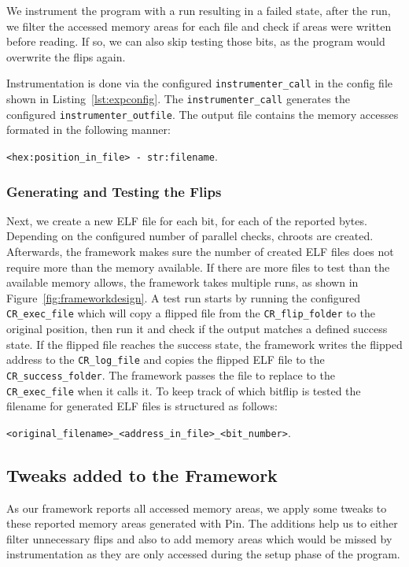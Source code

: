 We instrument the program with a run resulting in a failed state, after the run,
we filter the accessed memory areas for each file and check if areas were
written before reading. If so, we can also skip testing those bits, as the
program would overwrite the flips again.

Instrumentation is done via the configured \texttt{instrumenter\_call} in the
config file shown in Listing~\ref{lst:expconfig}. The
\texttt{instrumenter\_call} generates the configured
\texttt{instrumenter\_outfile}. The output file contains the memory accesses
formated in the following manner:

\mbox{\texttt{<hex:position\_in\_file> - str:filename}}.

\subsubsection{Generating and Testing the Flips}

Next, we create a new ELF file for each bit, for each of the reported bytes.
Depending on the configured number of parallel checks, chroots are created.
Afterwards, the framework makes sure the number of created ELF files does not
require more than the memory available. If there are more files to test than
the available memory allows, the framework takes multiple runs, as shown in
Figure~\ref{fig:frameworkdesign}. A test run starts by running the configured
\texttt{CR\_exec\_file} which will copy a flipped file from the
\texttt{CR\_flip\_folder} to the original position, then run it and check if the
output matches a defined success state. If the flipped file reaches the success
state, the framework writes the flipped address to the \texttt{CR\_log\_file}
and copies the flipped ELF file to the \texttt{CR\_success\_folder}. The
framework passes the file to replace to the \texttt{CR\_exec\_file} when it
calls it. To keep track of which bitflip is tested the filename for generated
ELF files is structured as follows:

\mbox{\texttt{<original\_filename>\_<address\_in\_file>\_<bit\_number>}}.

\subsection{Tweaks added to the Framework}

As our framework reports all accessed memory areas, we apply some tweaks to
these reported memory areas generated with Pin. The additions help us to either
filter unnecessary flips and also to add memory areas which would be missed by
instrumentation as they are only accessed during the setup phase of the program.

